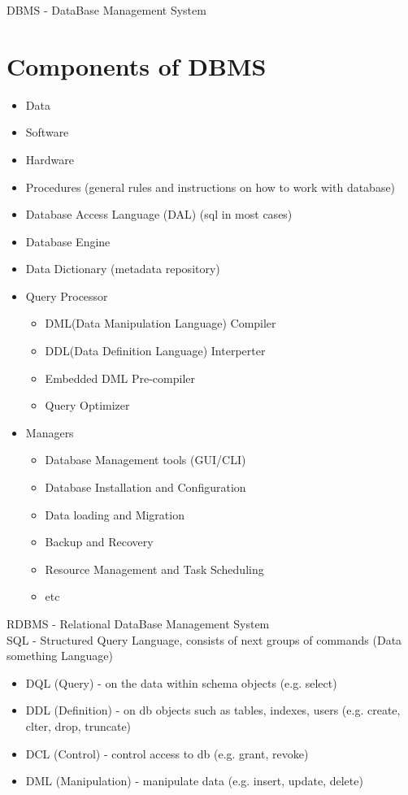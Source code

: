 \documentclass{article}
\begin{document}
    DBMS - DataBase Management System
    
    \section{Components of DBMS}
    \begin{itemize}
        \item Data
        \item Software
        \item Hardware
        \item Procedures (general rules and instructions on how to work with database)
        \item Database Access Language (DAL) (sql in most cases)
        \item Database Engine
        \item Data Dictionary (metadata repository)
        \item Query Processor \begin{itemize}
            \item DML(Data Manipulation Language) Compiler
            \item DDL(Data Definition Language) Interperter
            \item Embedded DML Pre-compiler
            \item Query Optimizer
        \end{itemize}
        \item Managers \begin{itemize}
            \item Database Management tools (GUI/CLI)
            \item Database Installation and Configuration
            \item Data loading and Migration
            \item Backup and Recovery
            \item Resource Management and Task Scheduling
            \item etc
        \end{itemize}
    \end{itemize}

    RDBMS - Relational DataBase Management System \\
    SQL - Structured Query Language, consists of next groups of commands (Data something Language)
    \begin{itemize}
        \item DQL (Query)        - on the data within schema objects (e.g. select)
        \item DDL (Definition)   - on db objects such as tables, indexes, users (e.g. create, clter, drop, truncate)
        \item DCL (Control)      - control access to db (e.g. grant, revoke)
        \item DML (Manipulation) - manipulate data (e.g. insert, update, delete)
    \end{itemize}
\end{document}
